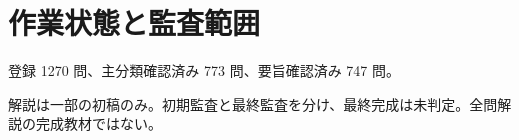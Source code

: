 \chapter{作業状態と監査範囲}
登録 1270 問、主分類確認済み 773 問、要旨確認済み 747 問。
\par 解説は一部の初稿のみ。初期監査と最終監査を分け、最終完成は未判定。全問解説の完成教材ではない。
